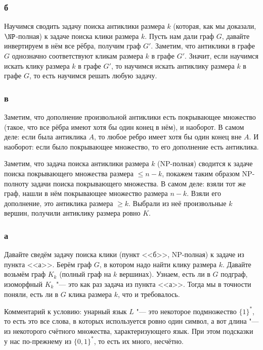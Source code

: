	\subsubsection{б}
		Научимся сводить задачу поиска антиклики размера $k$ (которая, как мы доказали, $\NP$-полная) к задаче поиска клики размера $k$.
		Пусть нам дали граф $G$, давайте инвертируем в нём все рёбра, получим граф $G'$.
		Заметим, что антиклики в графе $G$ однозначно соответствуют кликам размера $k$ в графе $G'$.
		Значит, если научимся искать клику размера $k$ в графе $G'$, то научимся искать антиклику размера
		$k$ в графе $G$, то есть научимся решать любую задачу.

	\subsubsection{в}
		Заметим, что дополнение произвольной антиклики есть покрывающее множество (такое,
		что все рёбра имеют хотя бы один конец в нём), и наоборот.
		В самом деле: если была антиклика $A$, то любое ребро имеет хотя бы один конец вне $A$.
		И наоборот: если было покрывающее множество, то его дополнение есть антиклика.

		Заметим, что задача поиска антиклики размера $k$ (NP-полная) сводится к задаче поиска
		покрывающего множества размера $\le n-k$, покажем таким образом NP-полноту задачи
		поиска покрывающего множества.
		В самом деле: взяли тот же граф, нашли в нём покрывающее множество размера $n-k$.
		Взяли его дополнение, это антиклика размера $\ge k$.
		Выбрали из неё произвольные $k$ вершин, получили антиклику размера ровно $K$.

	\subsubsection{а}
		Давайте сведём задачу поиска клики (пункт <<б>>, NP-полная) к задаче из пункта <<а>>.
		Берём граф $G$, в котором надо найти клику размера $k$.
		Давайте возьмём граф $K_k$ (полный граф на $k$ вершинах).
		Узнаем, есть ли в $G$ подграф, изоморфный $K_k$ "--- это как раз задача из пункта <<а>>.
		Тогда мы в точности поняли, есть ли в $G$ клика размера $k$, что и требовалось.

	Комментарий к условию: унарный язык $L$ "--- это некоторое подмножество $\{1\}^*$,
	то есть это все слова, в которых используется ровно один символ, а вот длина "--- из некоторого
	счётного множества, характеризующего язык.
	При этом подсказки у нас по-прежнему из $\{0,1\}^*$, то есть их много, несчётно.


